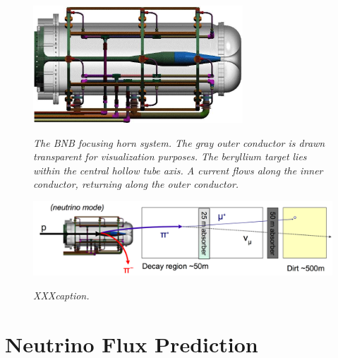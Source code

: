 


\begin{figure}[ht!]
\centering
	\includegraphics[width=0.7\textwidth]{Figures/BNB_horn_schematic.png} \\
\caption{\textit{The BNB focusing horn system. The gray outer conductor is drawn transparent for visualization purposes. The beryllium target lies within the central hollow tube axis. A current flows along the inner conductor, returning along the outer conductor.}}\label{BNB_horn_schematic}
\end{figure}


\begin{figure}[ht!]
\centering
	\includegraphics[width=1.0\textwidth]{Figures/BNB_numode_fig.png} \\
\caption{\textit{XXXcaption.}}\label{BNB_numode_fig}
\end{figure}



\section{Neutrino Flux Prediction}\label{beam_flux_descript_section}
